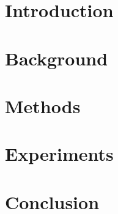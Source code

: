 \documentclass  [
paper    = a4,
BCOR     = 10mm,
twoside,
fontsize = 12pt,
toc      = bibnumbered,
toc      = listofnumbered,
numbers  = noendperiod,
headings = normal,
listof   = leveldown,
version  = 3.03
]                                       {scrreprt}
\begin{document}
	
	
	\tableofcontents
	
	\chapter{Introduction}
	
	
	\chapter{Background}
	
	
	\chapter{Methods}
	
	
	
	
	
	
	\chapter{Experiments}
	
	
	
	
	\chapter{Conclusion}
	
	
\end{document}
